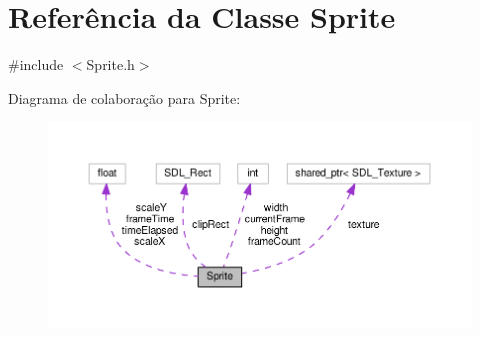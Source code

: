 \hypertarget{classSprite}{\section{Referência da Classe Sprite}
\label{classSprite}
}


{\ttfamily \#include $<$Sprite.\+h$>$}



Diagrama de colaboração para Sprite\+:\nopagebreak
\begin{figure}[H]
\begin{center}
\leavevmode
\includegraphics[width=350pt]{classSprite__coll__graph}
\end{center}
\end{figure}
